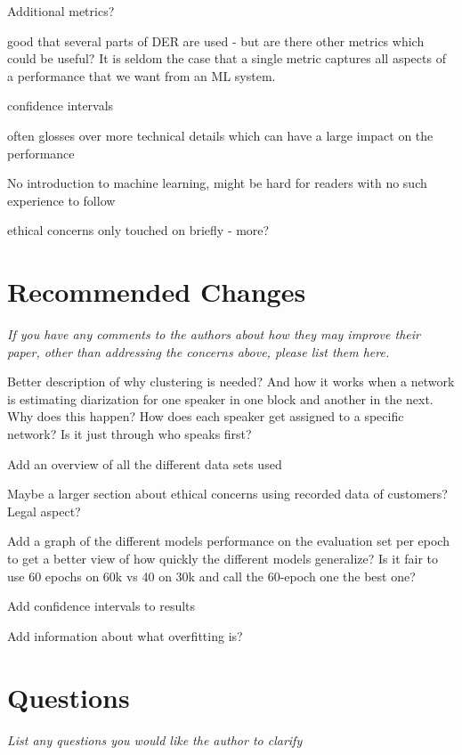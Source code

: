 \documentclass{article}
\begin{document}
Additional metrics?

good that several parts of DER are used - but are there other metrics which could be useful? It is seldom the case that a single metric captures all aspects of a performance that we want from an ML system.

confidence intervals

often glosses over more technical details which can have a large impact on the performance

No introduction to machine learning, might be hard for readers with no such experience to follow

ethical concerns only touched on briefly - more?

\section{Recommended Changes}

\textit{If you have any comments to the authors about how they may improve their paper, other than addressing the concerns above, please list them here.}

Better description of why clustering is needed? And how it works when a network is estimating diarization for one speaker in one block and another in the next. Why does this happen? How does each speaker get assigned to a specific network? Is it just through who speaks first?

Add an overview of all the different data sets used

Maybe a larger section about ethical concerns using recorded data of customers? Legal aspect?

Add a graph of the different models performance on the evaluation set per epoch to get a better view of how quickly the different models generalize? Is it fair to use 60 epochs on 60k vs 40 on 30k and call the 60-epoch one the best one?

Add confidence intervals to results

Add information about what overfitting is?

\section{Questions}

\textit{List any questions you would like the author to clarify}
\end{document}
